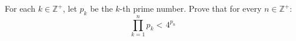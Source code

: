 For each $k \in \mathbb{Z}^{+}$,
let $p_k$ be the $k$-th prime number.
Prove that for every $n \in \mathbb{Z}^{+}$:
\begin{equation*}
  \prod\limits_{k = 1}^{n} {p_k}
  < \mspace{2mu} 4^{p_n}
\end{equation*}
